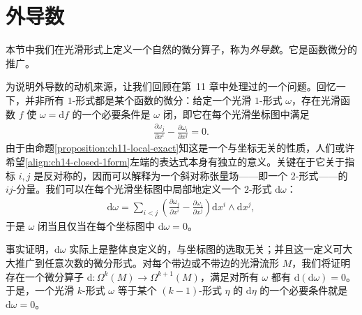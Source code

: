 \documentclass[../../main.tex]{subfiles}
\begin{document}
\section{外导数}\label{section:ch14-exterior-derivatives}

本节中我们在光滑形式上定义一个自然的微分算子，称为\emph{外导数}。它是函数微分的推广。

为说明外导数的动机来源，让我们回顾在第~11 章中处理过的一个问题。回忆一下，并非所有 $1$-形式都是某个函数的微分：给定一个光滑 $1$-形式 $\omega$，存在光滑函数 $f$ 使 $\omega=\mathrm{d}f$ 的一个必要条件是 $\omega$ 闭，即它在每个光滑坐标图中满足
\begin{align}
\frac{\partial\omega_j}{\partial x^i}-\frac{\partial\omega_i}{\partial x^j}=0.\label{align:ch14-closed-1form}
\end{align}
由于由命题\ref{proposition:ch11-local-exact}知这是一个与坐标无关的性质，人们或许希望\eqref{align:ch14-closed-1form}左端的表达式本身有独立的意义。关键在于它关于指标 $i,j$ 是反对称的，因而可以解释为一个斜对称张量场——即一个 $2$-形式——的 $ij$-分量。我们可以在每个光滑坐标图中局部地定义一个 $2$-形式 $\mathrm{d}\omega$：
\begin{align}
\mathrm{d}\omega=\sum_{i<j}\left(\frac{\partial\omega_j}{\partial x^i}-\frac{\partial\omega_i}{\partial x^j}\right)\mathrm{d}x^i\wedge\mathrm{d}x^j,\label{align:ch14-d1form}
\end{align}
于是 $\omega$ 闭当且仅当在每个坐标图中 $\mathrm{d}\omega=0$。

事实证明，$\mathrm{d}\omega$ 实际上是整体良定义的，与坐标图的选取无关；并且这一定义可大大推广到任意次数的微分形式。对每个带边或不带边的光滑流形 $M$，我们将证明存在一个微分算子 $\mathrm{d}:\Omega^k(M)\to\Omega^{k+1}(M)$，满足对所有 $\omega$ 都有 $\mathrm{d}(\mathrm{d}\omega)=0$。于是，一个光滑 $k$-形式 $\omega$ 等于某个 $(k-1)$-形式 $\eta$ 的 $\mathrm{d}\eta$ 的一个必要条件就是 $\mathrm{d}\omega=0$。
\end{document}
